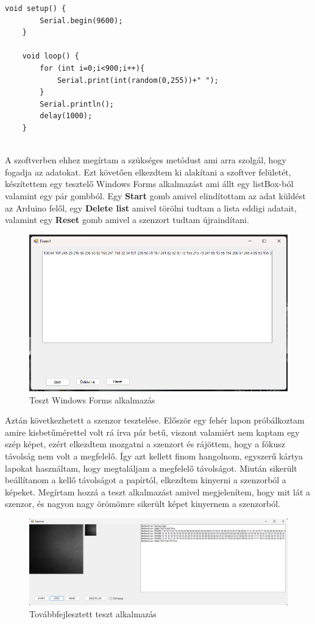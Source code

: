 \documentclass[]{thesis-ekf}
\theoremstyle{definition}
\theoremstyle{remark}
\begin{document}
\begin{lstlisting}[language=Arduino]
	void setup() {
		Serial.begin(9600);
	}
	
	void loop() {
		for (int i=0;i<900;i++){
			Serial.print(int(random(0,255))+" ");
		} 
		Serial.println();
		delay(1000);
	}
	
\end{lstlisting}

A szoftverben ehhez megírtam a szükséges metódust ami arra szolgál, hogy fogadja az adatokat. Ezt követően elkezdtem ki alakítani a szoftver felületét, készítettem egy tesztelő Windows Forms alkalmazást ami állt egy listBox-ból valamint egy pár gombból. Egy \textbf{Start} gomb amivel elindítottam az adat küldést az Arduino felől, egy \textbf{Delete list} amivel törölni tudtam a lista eddigi adatait, valamint egy \textbf{Reset} gomb amivel a szenzort tudtam újraindítani. 
\pagebreak
\begin{figure}[th!]
	\centering
	\includegraphics[width=0.7\linewidth]{tesztalkalmazas}
	\caption[Teszt alkalmazás]{Teszt Windows Forms alkalmazás}
	\label{fig:tesztalkalmazas}
\end{figure}

Aztán következhetett a szenzor tesztelése. Először egy fehér lapon próbálkoztam amire kisbetűmérettel volt rá írva pár betű, viszont valamiért nem kaptam egy szép képet, ezért elkezdtem mozgatni a szenzort és rájöttem, hogy a fókusz távolság nem volt a megfelelő. Így azt kellett finom hangolnom, egyszerű kártya lapokat használtam, hogy megtaláljam a megfelelő távolságot. Miután sikerült beállítanom a kellő távolságot a papírtól, elkezdtem kinyerni a szenzorból a képeket. Megírtam hozzá a teszt alkalmazást amivel megjelenítem, hogy mit lát a szenzor, és nagyon nagy örömömre sikerült képet kinyernem a szenzorból.
\begin{figure}[th!]
	\centering
	\includegraphics[width=1\linewidth]{tesztalkalmazas2}
	\caption[Teszt2]{Továbbfejlesztett teszt alkalmazás}
	\label{fig:tesztalkalmazas2}
\end{figure}
\end{document}
